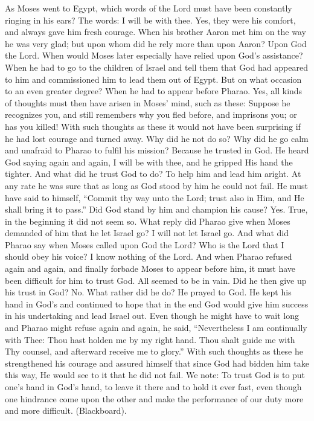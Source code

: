 As Moses went to Egypt, which words of the Lord must have been constantly ringing in his ears? The words: I will be with thee. Yes, they were his comfort, and always gave him fresh courage. When his brother Aaron met him on the way he was very glad; but upon whom did he rely more than upon Aaron? Upon God the Lord. When would Moses later especially have relied upon God’s assistance? When he had to go to the children of Israel and tell them that God had appeared to him and commissioned him to lead them out of Egypt. But on what occasion to an even greater degree? When he had to appear before Pharao. Yes, all kinds of thoughts must then have arisen in Moses’ mind, such as these: Suppose he recognizes you, and still remembers why you fled before, and imprisons you; or has you killed! With such thoughts as these it would not have been surprising if he had lost courage and turned away. Why did he not do so? Why did he go calm and unafraid to Pharao to fulfil his mission? Because he trusted in God. He heard God saying again and again, I will be with thee, and he gripped His hand the tighter. And what did he trust God to do? To help him and lead him aright. At any rate he was sure that as long as God stood by him he could
not fail. He must have said to himself, “Commit thy way unto the Lord; trust also in Him, and He shall bring it to pass.” Did God stand by him and champion his cause? Yes. True, in the beginning it did not seem so. What reply did Pharao give when Moses demanded of him that he let Israel go? I will not let Israel go. And what did Pharao say when Moses called upon God the Lord? Who is the Lord that I should obey his voice? I know nothing of the Lord. And when Pharao refused again and again, and finally forbade Moses to appear before him, it must have been difficult for him to trust God. All seemed to be in vain. Did he then give up his trust in God? No. What rather did he do? He prayed to God. He kept his hand in God’s and continued to hope that in the end God would give him success in his undertaking and lead Israel out. Even though he might have to wait long and Pharao might refuse again and again, he said, “Nevertheless I am continually with Thee: Thou hast holden me by my right hand. Thou shalt guide me with Thy counsel, and afterward receive me to glory.” With such thoughts as these he strengthened his courage and assured himself that since God had bidden him take this way, He would see to it that he did not fail. We note: To trust God is to put one’s hand in God’s hand, to leave it there and to hold it ever fast, even though one hindrance come upon the other and make the performance of our duty more and more difficult. (Blackboard).

